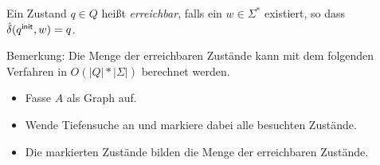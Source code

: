 \begin{Def}
  Ein Zustand $q \in Q$ heißt \emph{erreichbar}, falls ein $w \in \Sigma^*$ existiert, so dass $\hat \delta({q^\mathsf{init}}, w) = q$.
\end{Def}
Bemerkung: Die Menge der erreichbaren Zustände kann mit dem folgenden Verfahren in $O(|Q|*|\Sigma|)$ berechnet werden.
  \begin{itemize}
  \item Fasse $A$ als Graph auf.
  \item Wende Tiefensuche an und markiere dabei alle besuchten Zustände.
  \item Die markierten Zustände bilden die Menge der erreichbaren Zustände.
  \end{itemize}



